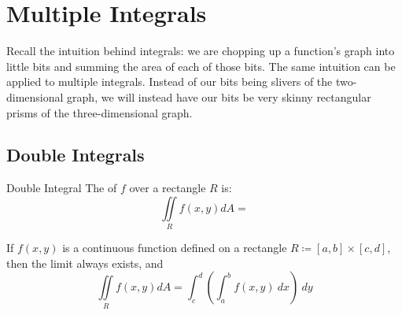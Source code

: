 \chapter{Multiple Integrals}


Recall the intuition behind integrals: we are chopping up a function's graph into little bits and summing the area of each of those bits. The same intuition can be applied to multiple integrals. Instead of our bits being slivers of the two-dimensional graph, we will instead have our bits be very skinny rectangular prisms of the three-dimensional graph.

\section{Double Integrals}

\begin{dfnbox}{Double Integral}{}
    The  of $f$ over a rectangle $R$ is:
    \[ \iint\limits_R f(x,y) dA =  \]
\end{dfnbox}

\begin{thmbox}{}{}
    If $f(x,y)$ is a continuous function defined on a rectangle $R \coloneq [a,b] \times [c,d]$, then the limit always exists, and
    \[ \iint\limits_R f(x,y) dA = \int_c^d \left( \int_a^b f(x,y)\ dx \right)\ dy \]
\end{thmbox}
